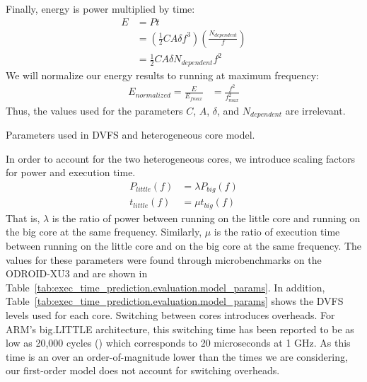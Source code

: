 Finally, energy is power multiplied by time:
\begin{align*}
  E &= Pt \\
    &= \left(\frac{1}{2}CA\delta f^3\right) \left(\frac{N_{dependent}}{f}\right) \\
    &= \frac{1}{2}CA\delta N_{dependent}f^2
\end{align*}
We will normalize our energy results to running at maximum frequency:
\begin{align*}
  E_{normalized} = \frac{E}{E_{fmax}} &= \frac{f^2}{f_{max}^2}
\end{align*}
Thus, the values used for the parameters $C$, $A$, $\delta$, and
$N_{dependent}$ are irrelevant.

\begin{table}
  \begin{center}
    \begin{footnotesize}
    
    \end{footnotesize}
    \caption{Parameters used in DVFS and heterogeneous core model.}
    \label{tab:exec_time_prediction.evaluation.model_params}
  \end{center}
\end{table}

In order to account for the two heterogeneous cores, we introduce scaling
factors for power and execution time.
\begin{align*}
  P_{little}(f) &= \lambda P_{big}(f) \\
  t_{little}(f) &= \mu t_{big}(f)
\end{align*}
That is, $\lambda$ is the ratio of power between running on the little core and
running on the big core at the same frequency. Similarly, $\mu$ is the ratio
of execution time between running on the little core and on the big core at the
same frequency. The values for these parameters were found through
microbenchmarks on the ODROID-XU3 and are shown in
Table~\ref{tab:exec_time_prediction.evaluation.model_params}. In addition,
Table~\ref{tab:exec_time_prediction.evaluation.model_params} shows the DVFS
levels used for each core. Switching between cores introduces overheads. For
ARM's big.LITTLE architecture, this switching time has been reported to be as
low as 20,000 cycles (\cite{cho-12}) which corresponds to 20 microseconds at 1
GHz. As this time is an over an order-of-magnitude lower than the times we are
considering, our first-order model does not account for switching overheads.

